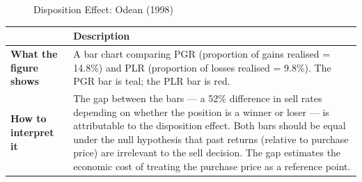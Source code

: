 \documentclass[12pt, letterpaper]{article}
\begin{document}
\begin{figure}[h]
\centering


\caption{Disposition Effect: Odean (1998)}
\end{figure}


\begin{table}[H]
\centering
\small
\begin{tabularx}{\linewidth}{lY}
\toprule
 & Description \\
\midrule
\textbf{What the figure shows} & A bar chart comparing PGR (proportion of gains realised = 14.8\%) and PLR (proportion of losses realised = 9.8\%). The PGR bar is teal; the PLR bar is red. \\
\textbf{How to interpret it} & The gap between the bars --- a 52\% difference in sell rates depending on whether the position is a winner or loser --- is attributable to the disposition effect. Both bars should be equal under the null hypothesis that past returns (relative to purchase price) are irrelevant to the sell decision. The gap estimates the economic cost of treating the purchase price as a reference point. \\
\bottomrule
\end{tabularx}
\end{table}
\end{document}
